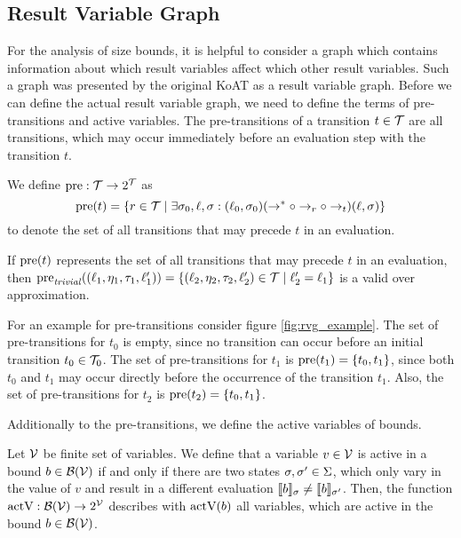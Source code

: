 \subsection{Result Variable Graph}

For the analysis of size bounds, it is helpful to consider a graph which contains information about which result variables affect which other result variables.
Such a graph was presented by the original KoAT \cite{koat} as a result variable graph.
Before we can define the actual result variable graph, we need to define the terms of pre-transitions and active variables.
The pre-transitions of a transition $t \in \mathcal{T}$ are all transitions, which may occur immediately before an evaluation step with the transition $t$.

\begin{definition} 
  We define $\text{pre}: \mathcal{T} \rightarrow 2^{\mathcal{T}}$ as
  \[\text{pre}(t) = \lbrace r \in \mathcal{T} \mid \exists \sigma_0, \ell, \sigma: (\ell_0, \sigma_0) (\rightarrow^* \circ \rightarrow_r \circ \rightarrow_{t}) (\ell, \sigma) \rbrace\]
  to denote the set of all transitions that may precede $t$ in an evaluation.	
\end{definition}

If $\text{pre}(t)$ represents the set of all transitions that may precede $t$ in an evaluation, then $\text{pre}_{\mathit{trivial}}((\ell_1, \eta_1, \tau_1, \ell_1')) = \lbrace (\ell_2, \eta_2, \tau_2, \ell_2') \in \mathcal{T} \mid \ell_2' = \ell_1 \rbrace$ is a valid over approximation.



For an example for pre-transitions consider figure \ref{fig:rvg_example}.
The set of pre-transitions for $t_0$ is empty, since no transition can occur before an initial transition $t_0 \in \mathcal{T}_0$.
The set of pre-transitions for $t_1$ is $\text{pre}(t_1) = \lbrace t_0, t_1 \rbrace$, since both $t_0$ and $t_1$ may occur directly before the occurrence of the transition $t_1$.
Also, the set of pre-transitions for $t_2$ is $\text{pre}(t_2) = \lbrace t_0, t_1 \rbrace$.

Additionally to the pre-transitions, we define the active variables of bounds. 

\begin{definition}
  Let $\mathcal{V}$ be finite set of variables.  
  We define that a variable $v \in \mathcal{V}$ is active in a bound $b \in \mathcal{B}(\mathcal{V})$ if and only if there are two states $\sigma, \sigma' \in \Sigma$, which only vary in the value of $v$ and result in a different evaluation $\llbracket b \rrbracket_{\sigma} \neq \llbracket b \rrbracket_{\sigma'}$.
  Then, the function $\text{actV}: \mathcal{B}(\mathcal{V}) \rightarrow 2^{\mathcal{V}}$ describes with $\text{actV}(b)$ all variables, which are active in the bound $b \in \mathcal{B}(\mathcal{V})$.
\end{definition}

